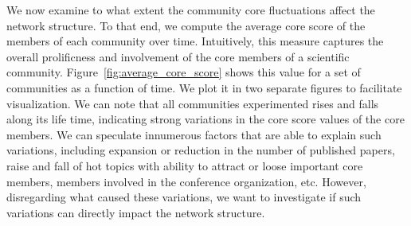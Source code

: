 \documentclass[letterpaper]{www13-companion-accepted}
\begin{document}
We now examine to what extent the community core fluctuations affect the network structure.  To that end, we compute the average core score of the members of each community over
time. Intuitively, this measure captures the overall prolificness and involvement of the core members of a scientific community. Figure~\ref{fig:average_core_score} shows this value
for a set of communities as a function of time. We plot it in two separate figures to facilitate visualization. We can note that all communities experimented rises and falls along
its life time, indicating strong variations in the core score values of the core members. We can speculate innumerous factors that are able to explain such variations,
including expansion or reduction in the number of published papers, raise and fall of hot topics with ability to attract or loose important core members, members involved in the
conference organization, etc. However, disregarding what caused these variations, we want to investigate if such variations can directly impact the network structure.
\end{document}
